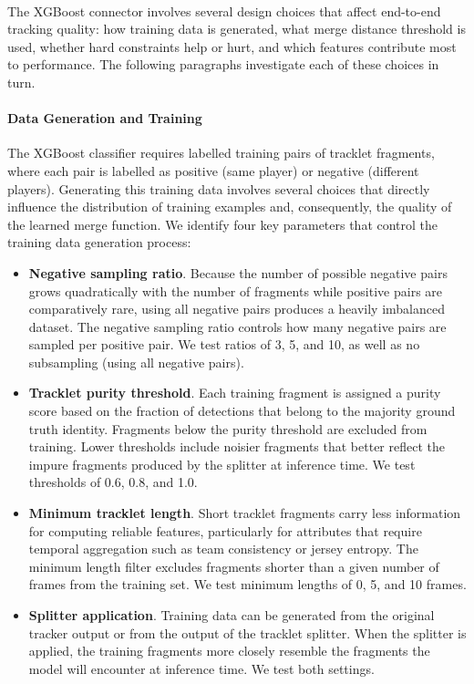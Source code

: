 \

The XGBoost connector involves several design choices that affect end-to-end tracking quality: how training data is generated, what merge distance threshold is used, whether hard constraints help or hurt, and which features contribute most to performance. The following paragraphs investigate each of these choices in turn.


\paragraph{Data Generation and Training}\label{par:data_gen}

The XGBoost classifier requires labelled training pairs of tracklet fragments, where each pair is labelled as positive (same player) or negative (different players). Generating this training data involves several choices that directly influence the distribution of training examples and, consequently, the quality of the learned merge function. We identify four key parameters that control the training data generation process:

\begin{itemize}
    \item \textbf{Negative sampling ratio}. Because the number of possible negative pairs grows quadratically with the number of fragments while positive pairs are comparatively rare, using all negative pairs produces a heavily imbalanced dataset. The negative sampling ratio controls how many negative pairs are sampled per positive pair. We test ratios of 3, 5, and 10, as well as no subsampling (using all negative pairs).

    \item \textbf{Tracklet purity threshold}. Each training fragment is assigned a purity score based on the fraction of detections that belong to the majority ground truth identity. Fragments below the purity threshold are excluded from training. Lower thresholds include noisier fragments that better reflect the impure fragments produced by the splitter at inference time. We test thresholds of 0.6, 0.8, and 1.0.

    \item \textbf{Minimum tracklet length}. Short tracklet fragments carry less information for computing reliable features, particularly for attributes that require temporal aggregation such as team consistency or jersey entropy. The minimum length filter excludes fragments shorter than a given number of frames from the training set. We test minimum lengths of 0, 5, and 10 frames.

    \item \textbf{Splitter application}. Training data can be generated from the original tracker output or from the output of the tracklet splitter. When the splitter is applied, the training fragments more closely resemble the fragments the model will encounter at inference time. We test both settings.
\end{itemize}

